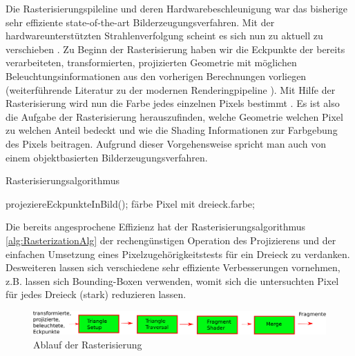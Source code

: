 Die Rasterisierungspileline und deren Hardwarebeschleunigung war das bisherige sehr effiziente \glqq state-of-the-art\grqq{} Bilderzeugungsverfahren. Mit der hardwareunterstützten 
Strahlenverfolgung scheint es sich nun zu aktuell zu verschieben \cite{Barre-Brisebois2019}. 
Zu Beginn der Rasterisierung haben wir die Eckpunkte der bereits verarbeiteten, transformierten, projizierten Geometrie mit möglichen
Beleuchtungsinformationen aus den vorherigen Berechnungen vorliegen (weiterführende Literatur zu der modernen
Renderingpipeline \cite{akenine2018real}). 
Mit Hilfe der Rasterisierung wird nun die Farbe jedes einzelnen Pixels bestimmt \cite{RasterisierungImplementierung}. Es ist also die Aufgabe der Rasterisierung herauszufinden, 
welche Geometrie welchen Pixel zu welchen Anteil bedeckt und wie die Shading Informationen zur Farbgebung des Pixels beitragen. 
Aufgrund dieser Vorgehensweise spricht man auch von einem objektbasierten Bilderzeugungsverfahren.

\begin{tcolorbox}
    \begin{algorithm}[H]
        \caption{Rasterisierungsalgorithmus}
        \begin{algorithmic}[1]
            \State projeziereEckpunkteInBild();
                \State färbe Pixel mit dreieck.farbe;
                \EndIf
            \EndFor
        \EndFor
        \EndProcedure
        \end{algorithmic}
        \label{alg:RasterizationAlg}
    \end{algorithm}
\end{tcolorbox}

Die bereits angesprochene Effizienz hat der Rasterisierungsalgorithmus \ref{alg:RasterizationAlg} der rechengünstigen Operation des Projizierens und der 
einfachen Umsetzung eines Pixelzugehörigkeitstests für ein Dreieck zu verdanken. Desweiteren lassen sich verschiedene sehr effiziente Verbesserungen vornehmen, 
z.B. lassen sich Bounding-Boxen verwenden, womit sich die untersuchten Pixel für jedes Dreieck (stark) reduzieren lassen. 

\begin{figure}[H]
    \begin{tcolorbox}
        \centering
        \includegraphics[width=\linewidth]{content/PathTracer/Bilder/Rasterisierung.pdf}
        \end{tcolorbox}
    \caption{Ablauf der Rasterisierung}
    \label{pic:Rasterisierungsablauf}
\end{figure}

